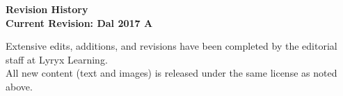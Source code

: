 \thispagestyle{plain}


\setlength{\parskip}{0pt}

\begin{center}
\fontsize{14pt}{16pt}\selectfont\textcolor{titletextcolour}{\textbf{Revision History \\ \smallskip  Current Revision: Dal 2017 A }}
\end{center}

{\footnotesize

\begin{center}
Extensive edits, additions, and revisions have been completed by the editorial staff at Lyryx Learning. \\
All new content (text and images) is released under the same license as noted above.
\end{center}

}
